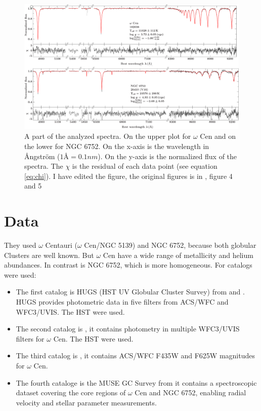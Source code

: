 \documentclass{aa}
\begin{document}
\begin{figure}
        \centering
        \includegraphics[width=\hsize]{fitSpecBearb.png}
        \caption{A part of the analyzed spectra. On the upper plot for $\omega$ Cen and on the lower for NGC 6752. On the x-axis is the wavelength in \AA ngstr\"om ($1 \text{\AA} = 0.1nm$). On the y-axis is the normalized flux of the spectra. The $\chi$ is the residual of each data point (see equation \ref{eq:chi}). I have edited the figure, the original figures is in \cite{2023A&A...677A..86L}, figure 4 and 5}
        \label{fig:Spec}
\end{figure}

\section{Data}
\label{sec:2}
They used $\omega$ Centauri ($\omega$ Cen/NGC 5139) and NGC 6752, because both globular Clusters are well known. But $\omega$ Cen have a wide range of metallicity and helium abundances. In contrast is NGC 6752, which is more homogeneous.  
For catalogs were used:

\begin{itemize}
\label{list:catalogs}
    \item The first catalog is HUGS (HST UV Globular Cluster Survey) from \cite{2015AJ....149...91P} and \cite{2018MNRAS.481.3382N}. HUGS provides photometric data in five filters from ACS/WFC and WFC3/UVIS. The HST were used.
    \item The second catalog is \cite{2017ApJ...842....6B}, it contains photometry in multiple WFC3/UVIS filters for $\omega$ Cen. The HST were used.

    \item The third catalog is \cite{2010ApJ...710.1032A}, it contains ACS/WFC F435W and F625W magnitudes for $\omega$ Cen.

    \item The fourth  cataloge is the MUSE GC Survey from \cite{2018MNRAS.473.5591K} it contains a spectroscopic dataset covering the core regions of $\omega$ Cen and NGC 6752, enabling radial velocity and stellar parameter measurements.
\end{itemize}
\end{document}
